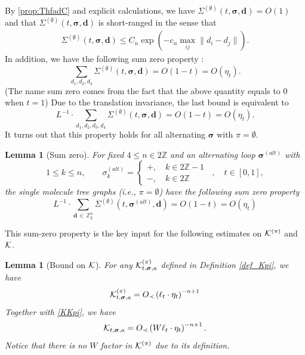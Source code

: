 \documentclass[10pt,reqno]{article}
\theoremstyle{plain} %
\newtheorem{lemma}[theorem]{Lemma}
\theoremstyle{remark}
\numberwithin{equation}{section}
\begin{document}
By \eqref{prop:ThfadC} and  explicit calculations,   we have 
$\Sigma^{(\emptyset)}(t, \boldsymbol{\sigma}, \textbf{d}) =O(1) $
and  that $\Sigma^{(\emptyset)}(t, \boldsymbol{\sigma}, \textbf{d})$ is short-ranged in the sense that 
\begin{align}\label{res_SIGempdd}
  \Sigma^{(\emptyset)}(t, \boldsymbol{\sigma}, \textbf{d})\le C_n\exp\left(-c_n \max_{ij}\|d_i-d_j\|\right)   .
\end{align}
In addition,  we have the following sum zero property :
\[
\sum_{d_1, d_2, d_3} \Sigma^{(\emptyset)}(t, \boldsymbol{\sigma}, \textbf{d}) = O(1-t) = O(\eta_t).
\]  
(The name sum zero comes from the fact that the above quantity equals to $0$ when $t=1$) 
Due to the translation invariance, the last  bound  is equivalent to 
\[
L^{-1} \cdot \sum_{d_1, d_2, d_3, d_4} \Sigma^{(\emptyset)}(t, \boldsymbol{\sigma}, \textbf{d}) = O(1-t) = O(\eta_t).
\] 
It turns out that this property holds  for all alternating  $\boldsymbol{\sigma}$ with  $\pi=\emptyset$.  

\begin{lemma}[Sum zero]\label{lem:SZ}
For fixed $4 \le n\in 2\mathbb Z$ and an alternating  loop $\boldsymbol{\sigma}^{(alt)}$ with 
\begin{equation}\label{assum_SZ_SinMole}
1\le k\le n, \quad \quad {\sigma}^{(alt)}_k =\begin{cases}
    +, \quad k\in 2\mathbb Z-1
    \\\nonumber
    -, \quad k\in 2\mathbb Z 
\end{cases}\; \;,\quad t\in[0,1]  ,  
\end{equation}
the single molecule tree graphs (i.e., $\pi=\emptyset$) have the following sum zero property  
\begin{equation}\label{res_SZ_SinMole}
L^{-1} \cdot\sum_{\textbf{d}\,\in \,\mathbb Z^{n}_L } \Sigma^{(\emptyset)}(t, \boldsymbol{\sigma}^{(alt)}, \textbf{d}) = O(1-t)=O(\eta_t)
\end{equation}
\end{lemma}
This sum-zero property is the key input for the  following estimates on $\cal K^{(\pi)}$ and $\cal K$. 
\begin{lemma}[Bound on ${\cal K}$]\label{ML:Kbound+pi}
For any ${\cal K}^{(\pi)}_{t, \boldsymbol{\sigma}, \textbf{a}}$ defined in Definition \ref{def_Kpi},   we have 
\begin{equation}\label{eq:bcal_k_pi}
  {\cal K}^{(\pi)}_{t, \boldsymbol{\sigma}, \textbf{a}} =O_\prec \left( \ell_t \cdot \eta_t \right)^{-n+1}    
\end{equation}
Together with \eqref{KKpi}, 
we have  
\begin{equation}\label{eq:bcal_k_2}
  {\cal K}_{t, \boldsymbol{\sigma}, \textbf{a}} =O_\prec\left(W \ell_t \cdot \eta_t \right)^{-n+1}    .
\end{equation}
Notice that there is no $W$ factor in ${\cal K}^{(\pi)}$ due to its definition.
\end{lemma}
\end{document}
